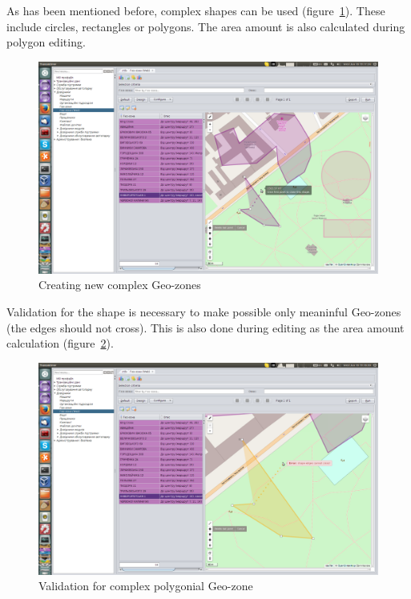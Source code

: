 \newpage
As has been mentioned before, complex shapes can be used (figure~\ref{fig:07}). These include circles, rectangles or polygons. The area amount is also calculated during polygon editing.

\begin{figure}[H]
\centering
\includegraphics[width=\linewidth]{chapters/01-geozones/images/07-creating-new-complex-geo-zones.png}
\caption{Creating new complex Geo-zones}\label{fig:07}
\end{figure}

\newpage
Validation for the shape is necessary to make possible only meaninful Geo-zones (the edges should not cross). This is also done during editing as the area amount calculation (figure~\ref{fig:08}).

\begin{figure}[H]
\centering
\includegraphics[width=\linewidth]{chapters/01-geozones/images/08-validation-for-complex-polygonial-geozone.png}
\caption{Validation for complex polygonial Geo-zone}\label{fig:08}
\end{figure}


